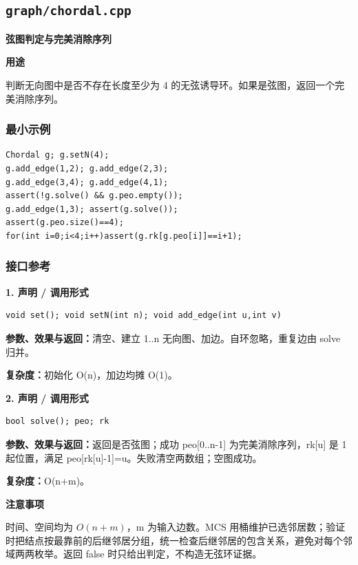 \documentclass[UTF8,a4paper,10pt]{ctexart}
\newcommand{\TemplUsage}[1]{\textbf{用途}\par #1\par}
\newcommand{\TemplNote}[1]{\textbf{注意事项}\par #1\par}
\begin{document}
\subsection{\texttt{graph/chordal.cpp}}
\textbf{弦图判定与完美消除序列}\par
\TemplUsage{判断无向图中是否不存在长度至少为 4 的无弦诱导环。如果是弦图，返回一个完美消除序列。}
\subsubsection*{最小示例}
\begin{lstlisting}
Chordal g; g.setN(4);
g.add_edge(1,2); g.add_edge(2,3);
g.add_edge(3,4); g.add_edge(4,1);
assert(!g.solve() && g.peo.empty());
g.add_edge(1,3); assert(g.solve());
assert(g.peo.size()==4);
for(int i=0;i<4;i++)assert(g.rk[g.peo[i]]==i+1);
\end{lstlisting}
\subsubsection*{接口参考}
\noindent\begin{minipage}{\textwidth}
\textbf{1. 声明 / 调用形式}
\begin{lstlisting}
void set(); void setN(int n); void add_edge(int u,int v)
\end{lstlisting}
\textbf{参数、效果与返回：}清空、建立 1..n 无向图、加边。自环忽略，重复边由 solve 归并。

\textbf{复杂度：}初始化 O(n)，加边均摊 O(1)。

\end{minipage}\par\vspace{0.4em}
\noindent\begin{minipage}{\textwidth}
\textbf{2. 声明 / 调用形式}
\begin{lstlisting}
bool solve(); peo; rk
\end{lstlisting}
\textbf{参数、效果与返回：}返回是否弦图；成功 peo[0..n-1] 为完美消除序列，rk[u] 是 1 起位置，满足 peo[rk[u]-1]=u。失败清空两数组；空图成功。

\textbf{复杂度：}O(n+m)。

\TemplNote{时间、空间均为 $O(n+m)$，m 为输入边数。MCS 用桶维护已选邻居数；验证时把结点按最靠前的后继邻居分组，统一检查后继邻居的包含关系，避免对每个邻域两两枚举。返回 false 时只给出判定，不构造无弦环证据。}
\end{minipage}\par\vspace{0.4em}
\clearpage
\end{document}
